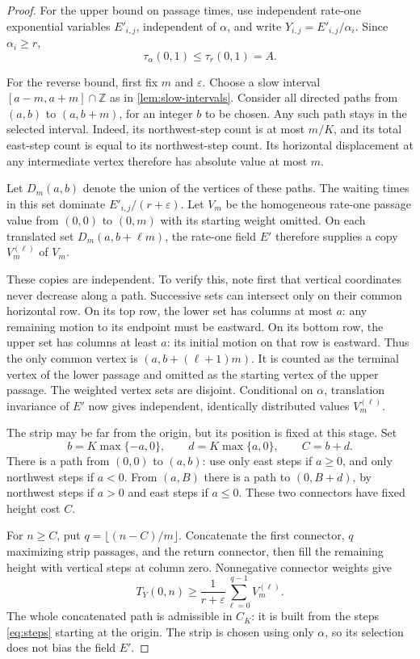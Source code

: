 \documentclass[11pt]{amsart}
\theoremstyle{remark}
\newcommand{\ZZ}{\mathbb Z}
\numberwithin{equation}{section}
\begin{document}
\begin{proof}
For the upper bound on passage times, use independent rate-one
exponential variables $E'_{i,j}$, independent of $\alpha$, and write
$Y_{i,j}=E'_{i,j}/\alpha_i$. Since $\alpha_i\geq r$,
\begin{equation}\label{eq:capacity-upper}
 \tau_\alpha(0,1)\leq\tau_r(0,1)=A.
\end{equation}

For the reverse bound, first fix $m$ and $\varepsilon$. Choose a slow
interval $[a-m,a+m]\cap\ZZ$ as in \cref{lem:slow-intervals}.
Consider all directed paths from $(a,b)$ to $(a,b+m)$, for an integer
$b$ to be chosen. Any such path stays in the selected interval.
Indeed, its northwest-step count is at most $m/K$, and its total
east-step count is equal to its northwest-step count. Its horizontal
displacement at any intermediate vertex therefore has absolute value
at most $m$.

Let $D_m(a,b)$ denote the union of the vertices of these paths.
The waiting times in this set dominate $E'_{i,j}/(r+\varepsilon)$.
Let $V_m$ be the homogeneous rate-one passage value from $(0,0)$ to
$(0,m)$ with its starting weight omitted. On each translated set
$D_m(a,b+\ell m)$, the rate-one field $E'$ therefore supplies a copy
$V_m^{(\ell)}$ of $V_m$.

These copies are independent. To verify this, note first that vertical
coordinates never decrease along a path. Successive sets can intersect
only on their common horizontal row. On its top row, the lower set
has columns at most $a$: any remaining motion to its endpoint must
be eastward. On its bottom row, the upper set has columns at least
$a$: its initial motion on that row is eastward. Thus the only common
vertex is $(a,b+(\ell+1)m)$. It is counted as the terminal vertex of
the lower passage and omitted as the starting vertex of the upper
passage. The weighted vertex sets are disjoint. Conditional on
$\alpha$, translation invariance of $E'$ now gives independent,
identically distributed values $V_m^{(\ell)}$.

The strip may be far from the origin, but its position is fixed at
this stage. Set
\[
 b=K\max\{-a,0\},\qquad d=K\max\{a,0\},\qquad C=b+d.
\]
There is a path from $(0,0)$ to $(a,b)$: use only east steps if
$a\geq0$, and only northwest steps if $a<0$. From $(a,B)$ there is
a path to $(0,B+d)$, by northwest steps if $a>0$ and east steps if
$a\leq0$. These two connectors have fixed height cost $C$.

For $n\geq C$, put $q=\lfloor(n-C)/m\rfloor$. Concatenate the first
connector, $q$ maximizing strip passages, and the return connector,
then fill the remaining height with vertical steps at column zero.
Nonnegative connector weights give
\begin{equation}\label{eq:strip-sum}
 T_Y(0,n)\geq\frac1{r+\varepsilon}
                    \sum_{\ell=0}^{q-1}V_m^{(\ell)}.
\end{equation}
The whole concatenated path is admissible in $C_K$: it is built from
the steps \eqref{eq:steps} starting at the origin. The strip is
chosen using only $\alpha$, so its selection does not bias the field
$E'$.


\end{proof}
\end{document}
